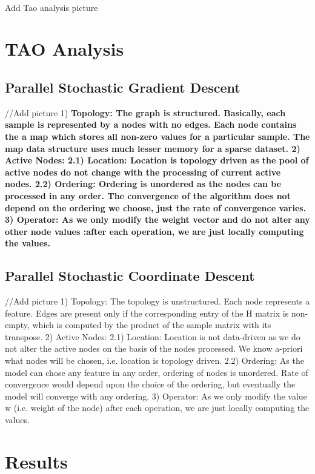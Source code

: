 \documentclass{sigplanconf}
\begin{document}
\\Add Tao analysis picture
\section{TAO Analysis}
\subsection{Parallel Stochastic Gradient Descent}
//Add picture
1) \bf{Topology}: The graph is structured. Basically, each sample is represented by a nodes with no edges. Each node contains the
a map which stores all non-zero values for a particular sample. The map data structure uses much lesser memory for a sparse dataset. 
2) \bf{Active Nodes}:
2.1) \bf{Location}: Location is topology driven as the pool of active nodes do not change with the
processing of current active nodes.
2.2) \bf{Ordering}: Ordering is unordered as the nodes can be processed in any order. The convergence of the algorithm does not 
depend on the ordering we choose, just the rate of convergence varies.
3) \bf{Operator}: As we only modify the weight vector and do not alter any other node values :after each operation, we are just
locally computing the values.

\subsection{Parallel Stochastic Coordinate Descent}
//Add picture
1) Topology: The topology is unstructured. Each node represents a feature. Edges are present only if the corresponding entry of the H matrix is
non-empty, which is computed by the product of the sample matrix with its transpose.
2) Active Nodes:
2.1) Location: Location is not data-driven as we do not alter the active nodes on the basis of the
nodes processed. We know a-priori what nodes will be chosen, i.e. location is topology driven.
2.2) Ordering: As the model can chose any feature in any order, ordering of nodes is unordered. Rate
of convergence would depend upon the choice of the ordering, but eventually the model will converge
with any ordering.
3) Operator: As we only modify the value w (i.e. weight of the node) after each operation, we are just
locally computing the values.

\section{Results}
\end{document}

